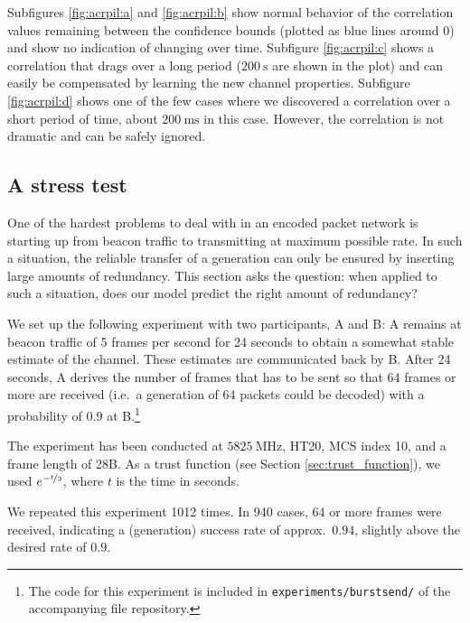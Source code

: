 \documentclass[10pt,a4paper]{article}
\begin{document}
Subfigures \ref{fig:acrpil:a} and \ref{fig:acrpil:b} show normal behavior of the correlation values remaining between the confidence bounds (plotted as blue lines around 0) and show no indication of changing over time.
Subfigure \ref{fig:acrpil:c} shows a correlation that drags over a long period ($\SI{200}{\second}$ are shown in the plot) and can easily be compensated by learning the new channel properties.
Subfigure \ref{fig:acrpil:d} shows one of the few cases where we discovered a correlation over a short period of time, about $\SI{200}{\milli\second}$ in this case.
However, the correlation is not dramatic and can be safely ignored.

\subsection{A stress test}

One of the hardest problems to deal with in an encoded packet network %
is starting up from beacon traffic to transmitting at maximum possible rate.
In such a situation, the reliable transfer of a generation can only be ensured by inserting large amounts of redundancy.
This section asks the question: when applied to such a situation, does our model predict the right amount of redundancy?

We set up the following experiment with two participants, A and B:
A remains at beacon traffic of 5 frames per second for 24 seconds to obtain a somewhat stable estimate of the channel.
These estimates are communicated back by B.
After 24 seconds, A derives the number of frames that has to be sent so that 64 frames or more are received (i.e.\ a generation of 64 packets could be decoded) with a probability of $0.9$ at B.\footnote{The code for this experiment is included in \texttt{experiments/burstsend/} of the accompanying file repository.}

The experiment has been conducted at $\SI{5825}{\mega\hertz}$, HT20, MCS index 10, and a frame length of 28B.
As a trust function (see Section \ref{sec:trust_function}), we used $e^{-\nicefrac{t}{3}}$, where $t$ is the time in seconds.

We repeated this experiment 1012 times.
In 940 cases, 64 or more frames were received, indicating a (generation) success rate of approx.\ $0.94$, slightly above the desired rate of $0.9$.
\end{document}
